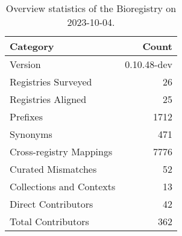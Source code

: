 \begin{table}
\caption{Overview statistics of the Bioregistry on 2023-10-04.}
\label{tab:bioregistry-summary}
\begin{tabular}{lr}
\toprule
Category & Count \\
\midrule
Version & 0.10.48-dev \\
Registries Surveyed & 26 \\
Registries Aligned & 25 \\
Prefixes & 1712 \\
Synonyms & 471 \\
Cross-registry Mappings & 7776 \\
Curated Mismatches & 52 \\
Collections and Contexts & 13 \\
Direct Contributors & 42 \\
Total Contributors & 362 \\
\bottomrule
\end{tabular}
\end{table}
